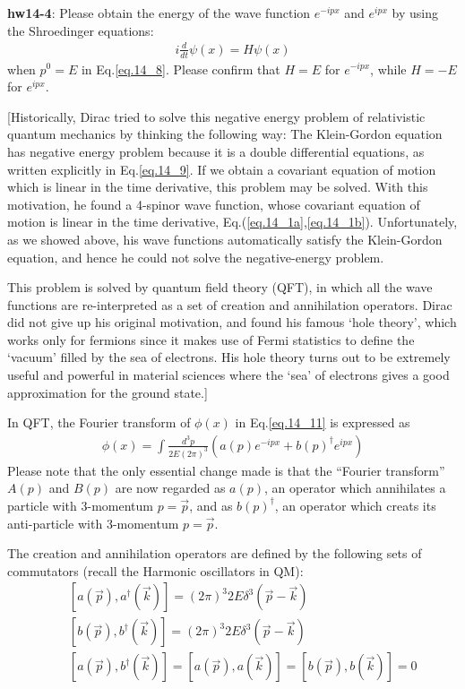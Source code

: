 \documentclass[12pt]{article}
\begin{document}
{\bf hw14-4}: Please obtain the energy of the wave function $e^{-ipx}$ and
  $e^{ipx}$ by using the Shroedinger equations:
\begin{eqnarray}
  i\frac{d}{dt} \psi(x) = H \psi(x) \label{eq.14_12}
\end{eqnarray}
  when $p^0 = E$ in Eq.\ref{eq.14_8}. Please confirm that $H=E$ for $e^{-ipx}$, while $H=-E$ for $e^{ipx}$.

  [Historically, Dirac tried to solve this negative energy problem of
  relativistic quantum mechanics by thinking the following way:
  The Klein-Gordon equation has negative energy problem because it is
  a double differential equations, as written explicitly in Eq.\ref{eq.14_9}.
  If we obtain a covariant equation of motion which is linear in
  the time derivative, this problem may be solved.  With this motivation,
  he found a 4-spinor wave function, whose covariant equation of motion
  is linear in the time derivative, Eq.(\ref{eq.14_1a},\ref{eq.14_1b}).  Unfortunately, as we showed above, his wave functions automatically satisfy the Klein-Gordon equation, and hence he could not solve the negative-energy problem.

  This problem is solved by quantum field theory (QFT), in which all
  the wave functions are re-interpreted as a set of creation and
  annihilation operators.  Dirac did not give up his original motivation,
  and found his famous `hole theory', which works only for fermions
  since it makes use of Fermi statistics to define the `vacuum' filled
  by the sea of electrons.  His hole theory turns out to be extremely
  useful and powerful in material sciences where the `sea' of electrons
  gives a good approximation for the ground state.]

  In QFT, the Fourier transform of $\phi(x)$ in Eq.\ref{eq.14_11} is expressed as
\begin{eqnarray}
  \phi(x) = \int \frac{d^3p}{2E(2\pi)^3} (a(p) e^{-ipx} + b(p)^\dagger e^{ipx}) \label{eq.14_13}
\end{eqnarray}
  Please note that the only essential change made is that the ``Fourier
  transform'' $A(p)$ and $B(p)$ are now regarded as $a(p)$, an operator which
  annihilates a particle with 3-momentum $p=\vec p$, and as $b(p)^\dagger$, an
  operator which creats its anti-particle with 3-momentum $p=\vec p$.

  The creation and annihilation operators are defined by the following
  sets of commutators (recall the Harmonic oscillators in QM):
\begin{eqnarray}
  &&[ a({\vec p}), a^\dagger({\vec k}) ] = (2\pi)^3 2E \delta^3({\vec p}-{\vec k}) \label{eq.14_14a} \\
  &&[ b({\vec p}), b^\dagger({\vec k}) ] = (2\pi)^3 2E \delta^3({\vec p}-{\vec k}) \label{eq.14_14b}  \\ 
  &&  [ a({\vec p}), b^\dagger({\vec k}) ]= [a({\vec p}), a({\vec k}) ]=[b({\vec p}), b({\vec k}) ]=0 \label{eq.14_14c}
\end{eqnarray}
\end{document}
